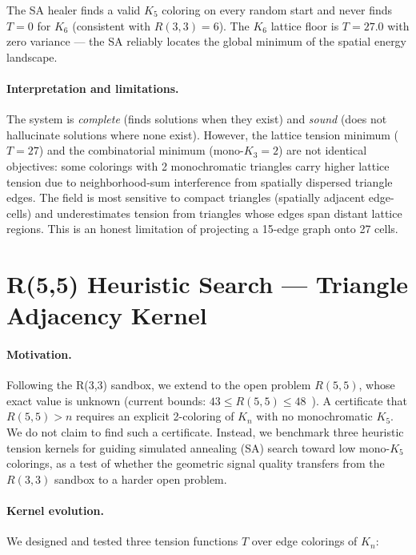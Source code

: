 \documentclass{article}
\begin{document}
The SA healer finds a valid $K_5$ coloring on every random start and never finds $T=0$
for $K_6$ (consistent with $R(3,3)=6$).
The $K_6$ lattice floor is $T=27.0$ with zero variance — the SA reliably locates the
global minimum of the spatial energy landscape.

\paragraph{Interpretation and limitations.}
The system is \emph{complete} (finds solutions when they exist) and \emph{sound}
(does not hallucinate solutions where none exist).
However, the lattice tension minimum ($T=27$) and the combinatorial minimum
(mono-$K_3 = 2$) are not identical objectives: some colorings with 2 monochromatic
triangles carry higher lattice tension due to neighborhood-sum interference from
spatially dispersed triangle edges.
The field is most sensitive to compact triangles (spatially adjacent edge-cells) and
underestimates tension from triangles whose edges span distant lattice regions.
This is an honest limitation of projecting a 15-edge graph onto 27 cells.

\section{R(5,5) Heuristic Search — Triangle Adjacency Kernel}
\label{sec:r55}

\paragraph{Motivation.}
Following the R(3,3) sandbox, we extend to the open problem $R(5,5)$, whose exact value is
unknown (current bounds: $43 \le R(5,5) \le 48$~\cite{exoo1989,mckay1995}).
A certificate that $R(5,5)>n$ requires an explicit 2-coloring of $K_n$ with no monochromatic $K_5$.
We do not claim to find such a certificate.
Instead, we benchmark three heuristic tension kernels for guiding simulated annealing (SA)
search toward low mono-$K_5$ colorings, as a test of whether the geometric signal quality
transfers from the $R(3,3)$ sandbox to a harder open problem.

\paragraph{Kernel evolution.}
We designed and tested three tension functions $T$ over edge colorings of $K_n$:
\end{document}
